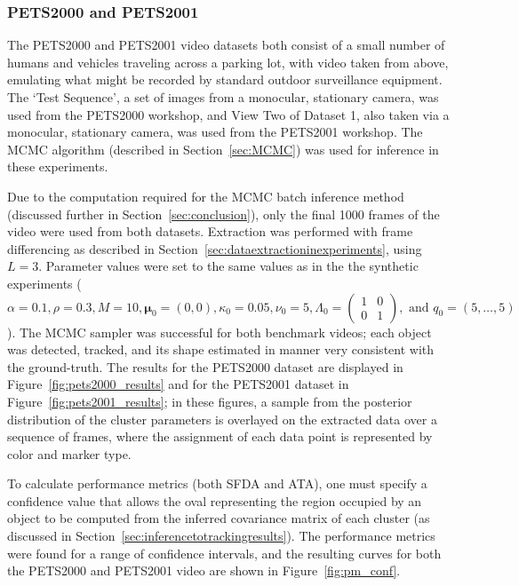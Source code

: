 \documentclass[twocolumn, final]{svjour3}
\begin{document}
\subsubsection{PETS2000 and PETS2001}
\label{sec:pets2000and2001}

The PETS2000 and PETS2001 video datasets both consist of a small number of humans and vehicles traveling across a parking lot, with video taken from above, emulating what might be recorded by standard outdoor surveillance equipment. The `Test Sequence', a set of images from a monocular, stationary camera, was used from the PETS2000 workshop, and View Two of Dataset 1, also taken via a monocular, stationary camera, was used from the PETS2001 workshop. The MCMC algorithm (described in Section~\ref{sec:MCMC}) was used for inference in these experiments.

Due to the computation required for the MCMC batch inference method (discussed further in Section~\ref{sec:conclusion}), only the final 1000 frames of the video were used from both datasets. Extraction was performed with frame differencing as described in Section~\ref{sec:dataextractioninexperiments}, using $L=3$. Parameter values were set to the same values as in the the synthetic experiments ($\alpha = 0.1, \rho = 0.3, M = 10, \boldsymbol{\mu}_{0} = (0,0), \kappa_{0} = 0.05, \nu_{0} = 5, \Lambda_{0} = \left( \begin{smallmatrix} 1&0\\ 0&1 \end{smallmatrix} \right), \text{ and } q_{0} = (5, \ldots, 5)$). The MCMC sampler was successful for both benchmark videos; each object was detected, tracked, and its shape estimated in manner very consistent with the ground-truth. The results for the PETS2000 dataset are displayed in Figure~\ref{fig:pets2000_results} and for the PETS2001 dataset in Figure~\ref{fig:pets2001_results}; in these figures, a sample from the posterior distribution of the cluster parameters is overlayed on the extracted data over a sequence of frames, where the assignment of each data point is represented by color and marker type.


To calculate performance metrics (both SFDA and ATA), one must specify a confidence value that allows the oval representing the region occupied by an object to be computed from the inferred covariance matrix of each cluster (as discussed in Section~\ref{sec:inferencetotrackingresults}). The performance metrics were found for a range of confidence intervals, and the resulting curves for both the PETS2000 and PETS2001 video are shown in Figure~\ref{fig:pm_conf}.
\end{document}
